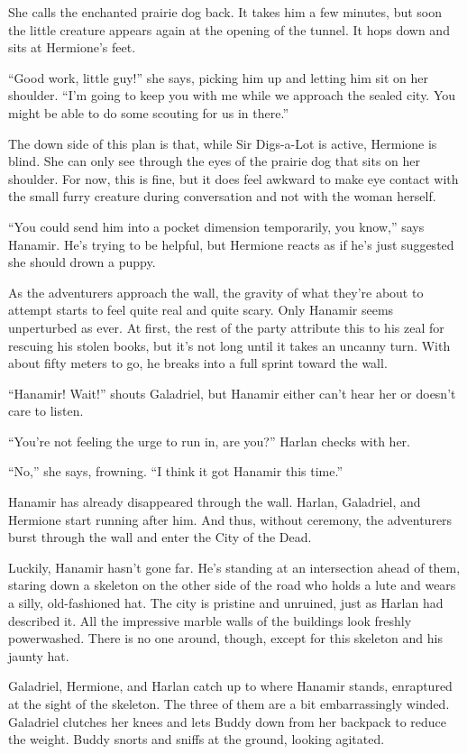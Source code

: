 \documentclass[smalldemyvopaper,11pt,twoside,onecolumn,openright,extrafontsizes]{memoir}
\begin{document}
She calls the enchanted prairie dog back. It takes him a few minutes,
but soon the little creature appears again at the opening of the tunnel.
It hops down and sits at Hermione's feet.

``Good work, little guy!'' she says, picking him up and letting him sit
on her shoulder. ``I'm going to keep you with me while we approach the
sealed city. You might be able to do some scouting for us in there.''

The down side of this plan is that, while Sir Digs-a-Lot is active,
Hermione is blind. She can only see through the eyes of the prairie dog
that sits on her shoulder. For now, this is fine, but it does feel
awkward to make eye contact with the small furry creature during
conversation and not with the woman herself.

``You could send him into a pocket dimension temporarily, you know,''
says Hanamir. He's trying to be helpful, but Hermione reacts as if he's
just suggested she should drown a puppy.

As the adventurers approach the wall, the gravity of what they're about
to attempt starts to feel quite real and quite scary. Only Hanamir seems
unperturbed as ever. At first, the rest of the party attribute this to
his zeal for rescuing his stolen books, but it's not long until it takes
an uncanny turn. With about fifty meters to go, he breaks into a full
sprint toward the wall.

``Hanamir! Wait!'' shouts Galadriel, but Hanamir either can't hear her
or doesn't care to listen.

``You're not feeling the urge to run in, are you?'' Harlan checks with
her.

``No,'' she says, frowning. ``I think it got Hanamir this time.''

Hanamir has already disappeared through the wall. Harlan, Galadriel, and
Hermione start running after him. And thus, without ceremony, the
adventurers burst through the wall and enter the City of the Dead.

Luckily, Hanamir hasn't gone far. He's standing at an intersection ahead
of them, staring down a skeleton on the other side of the road who holds
a lute and wears a silly, old-fashioned hat. The city is pristine and
unruined, just as Harlan had described it. All the impressive marble
walls of the buildings look freshly powerwashed. There is no one around,
though, except for this skeleton and his jaunty hat.

Galadriel, Hermione, and Harlan catch up to where Hanamir stands,
enraptured at the sight of the skeleton. The three of them are a bit
embarrassingly winded. Galadriel clutches her knees and lets Buddy down
from her backpack to reduce the weight. Buddy snorts and sniffs at the
ground, looking agitated.
\end{document}
